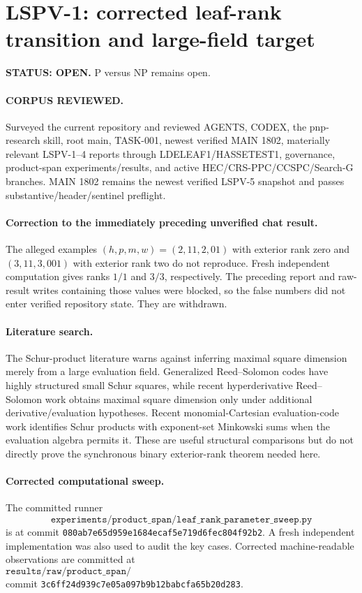 \documentclass[11pt]{article}
\begin{document}
\section*{LSPV-1: corrected leaf-rank transition and large-field target}
\textbf{STATUS: OPEN.} P versus NP remains open.

\paragraph{CORPUS REVIEWED.}
Surveyed the current repository and reviewed AGENTS, CODEX, the pnp-research skill, root main, TASK-001, newest verified MAIN 1802, materially relevant LSPV-1--4 reports through LDELEAF1/HASSETEST1, governance, product-span experiments/results, and active HEC/CRS-PPC/CCSPC/Search-G branches. MAIN 1802 remains the newest verified LSPV-5 snapshot and passes substantive/header/sentinel preflight.

\paragraph{Correction to the immediately preceding unverified chat result.}
The alleged examples $(h,p,m,w)=(2,11,2,01)$ with exterior rank zero and $(3,11,3,001)$ with exterior rank two do not reproduce. Fresh independent computation gives ranks $1/1$ and $3/3$, respectively. The preceding report and raw-result writes containing those values were blocked, so the false numbers did not enter verified repository state. They are withdrawn.

\paragraph{Literature search.}
The Schur-product literature warns against inferring maximal square dimension merely from a large evaluation field. Generalized Reed--Solomon codes have highly structured small Schur squares, while recent hyperderivative Reed--Solomon work obtains maximal square dimension only under additional derivative/evaluation hypotheses. Recent monomial-Cartesian evaluation-code work identifies Schur products with exponent-set Minkowski sums when the evaluation algebra permits it. These are useful structural comparisons but do not directly prove the synchronous binary exterior-rank theorem needed here.

\paragraph{Corrected computational sweep.}
The committed runner
\[
\texttt{experiments/product\_span/leaf\_rank\_parameter\_sweep.py}
\]
is at commit \texttt{080ab7e65d959e1684ecaf5e719d6fec804f92b2}. A fresh independent implementation was also used to audit the key cases. Corrected machine-readable observations are committed at
\[
\texttt{results/raw/product\_span/2026-10-01\_LSPV1\_leaf\_rank\_transition\_corrected.json}
\]
commit \texttt{3c6ff24d939c7e05a097b9b12babcfa65b20d283}.
\end{document}
